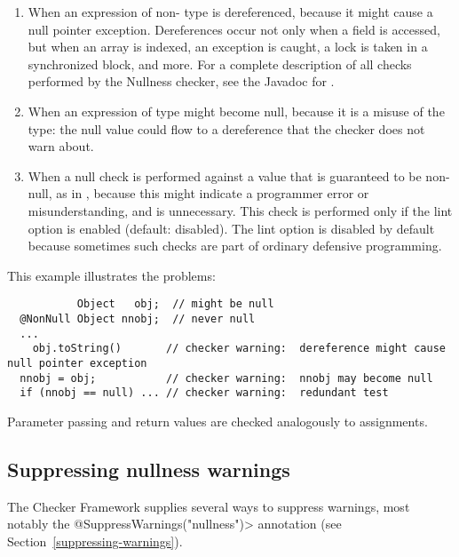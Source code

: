 \begin{enumerate}

\item
  When an expression of non- type
  is dereferenced, because it might cause a null pointer exception.
  Dereferences occur not only when a field is accessed, but when an array
  is indexed, an exception is caught, a lock is taken in a synchronized
  block, and more.  For a complete description of all checks performed by
  the Nullness checker, see the Javadoc for
  .

\item
  When an expression of  type
  might become null, because it
  is a misuse of the type:  the null value could flow to a dereference that
  the checker does not warn about.

\item
  \label{lint-nulltest}
  When a null check is performed against a value that is guaranteed to be
  non-null, as in , because this might indicate a
  programmer error or misunderstanding, and is unnecessary.
  This check is performed only if the  lint option is
  enabled (default: disabled).  The lint option is disabled by default
  because sometimes such checks are part of ordinary defensive programming.

\end{enumerate}

This example illustrates the problems:

\begin{Verbatim}
           Object   obj;  // might be null
  @NonNull Object nnobj;  // never null
  ...
    obj.toString()       // checker warning:  dereference might cause null pointer exception
  nnobj = obj;           // checker warning:  nnobj may become null
  if (nnobj == null) ... // checker warning:  redundant test
\end{Verbatim}

Parameter passing and return values are checked analogously to assignments.



\subsection{Suppressing nullness warnings\label{suppressing-warnings-nullness}}

The Checker Framework supplies several ways to suppress warnings, most
notably the \<@SuppressWarnings("nullness")> annotation (see
Section~\ref{suppressing-warnings}).

